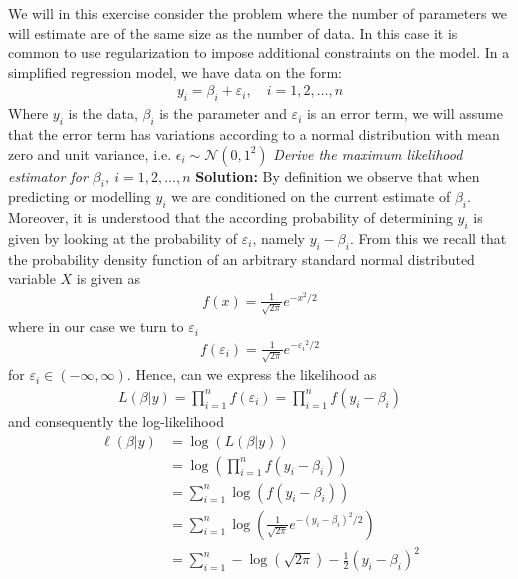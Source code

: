 We will in this exercise consider the problem where the number
of parameters we will estimate are of the same size as the number of data. In this case it is
common to use regularization to impose additional constraints on the model. In a simplified
regression model, we have data on the form:
\begin{align*}
    y_i = \beta_i + \varepsilon_i, \quad i = 1, 2, \ldots, n
\end{align*}
Where $y_i$ is the data, $\beta_i $ is the parameter and $\varepsilon_i$ is an error term, we will assume that the error term has variations according to a normal distribution with mean zero and unit variance, i.e. $\epsilon_i \sim \mathcal{N}(0,1^2)$
\emph{Derive the maximum likelihood estimator for $\beta_i, \ i = 1, 2, \ldots, n$} \spaze 
\textbf{Solution:} \spaze
By definition we observe that when predicting or modelling $y_i$ we are conditioned on the current estimate of $\beta_i$. Moreover, it is understood that the according probability of determining $y_i$ is given by looking at the probability of $\varepsilon_i$, namely $y_i - \beta_i$. From this we recall that the probability density function of an arbitrary standard normal distributed variable $X$ is given as 
\begin{align*}
    f(x) = \frac{1}{\sqrt{2 \pi}} e^{-x^2/2}
\end{align*}
where in our case we turn to $\varepsilon_i$ 
\begin{align}
    f(\varepsilon_i) = \frac{1}{\sqrt{2 \pi}} e^{-\varepsilon_{i}{^2}/2}
\end{align}
for $\varepsilon_i \in (-\infty, \infty)$. Hence, can we express the likelihood as 
\begin{align}
    L(\beta | y) = \prod_{i=1}^{n} f(\varepsilon_i) =  \prod_{i=1}^{n} f(y_i - \beta_i)
\end{align}
and consequently the log-likelihood 
\begin{align*}
    \ell(\beta | y) &= \log \left(L(\beta | y) \right) \\[5pt] 
    &= \log \left(\prod_{i=1}^{n} f(y_i - \beta_i) \right) \\[5pt] 
    &= \sum_{i=1}^{n} \log \left( f(y_i - \beta_i) \right) \\[5pt] 
    &= \sum_{i=1}^{n} \log \left( \frac{1}{\sqrt{2 \pi}} e^{- (y_i - \beta_i)^2 / 2} \right) \\[5pt] 
    &= \sum_{i=1}^{n} -\log(\sqrt{2\pi}) - \frac{1}{2} (y_i - \beta_i)^2
\end{align*}
